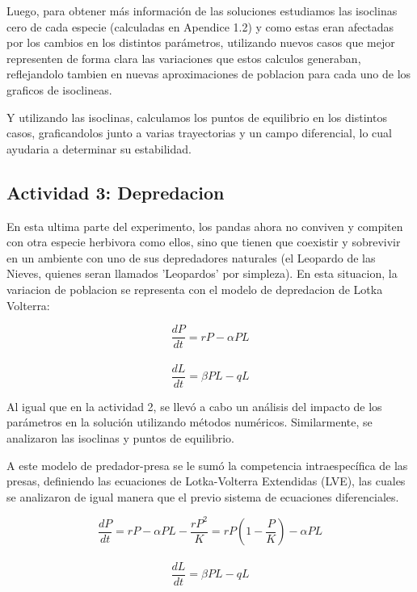\documentclass{article}
\begin{document}
\noindent Luego, para obtener más información de las soluciones estudiamos las isoclinas cero de cada especie (calculadas en Apendice 1.2) y como estas eran afectadas por los cambios en los distintos parámetros, utilizando nuevos casos que mejor representen de forma clara las variaciones que estos calculos generaban, reflejandolo tambien en nuevas aproximaciones de poblacion para cada uno de los graficos de isoclineas. \vspace{1\baselineskip}

\noindent Y utilizando las isoclinas, calculamos los puntos de equilibrio en los distintos casos, graficandolos junto a varias trayectorias y un campo diferencial, lo cual ayudaria a determinar su estabilidad.



\subsection*{Actividad 3: Depredacion}
\noindent En esta ultima parte del experimento, los pandas ahora no conviven y compiten con otra especie herbivora como ellos, sino que tienen que coexistir y sobrevivir en un ambiente con uno de sus depredadores naturales (el Leopardo de las Nieves, quienes seran llamados 'Leopardos' por simpleza). En esta situacion, la variacion de poblacion se representa con el modelo de depredacion de Lotka Volterra:
\vspace{0.5\baselineskip}

\setlength{\baselineskip}{1\baselineskip}
\[\frac{dP}{dt} = rP - \alpha PL \]\\
\[\frac{dL}{dt} = \beta PL - qL\]
\vspace{0.75\baselineskip}

\noindent Al igual que en la actividad 2, se llevó a cabo un análisis del impacto de los parámetros en la solución utilizando métodos numéricos. Similarmente, se analizaron las isoclinas y puntos de equilibrio. \vspace{1\baselineskip}

\noindent A este modelo de predador-presa se le sumó la competencia intraespecífica de las presas, definiendo las ecuaciones de Lotka-Volterra Extendidas (LVE), las cuales se analizaron de igual manera que el previo sistema de ecuaciones diferenciales. \vspace{0.5\baselineskip}

\setlength{\baselineskip}{1\baselineskip}
\[\frac{dP}{dt} = rP - \alpha PL - \frac{rP^2}{K} = rP \left(1 - \frac{P}{K}\right) - \alpha PL \]\\
\[\frac{dL}{dt} = \beta PL - qL\]
\vspace{0.75\baselineskip}
\end{document}
